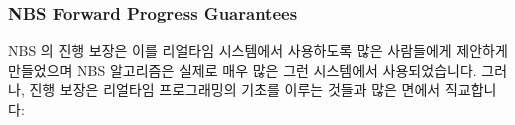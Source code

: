 \fi

\subsubsection{NBS Forward Progress Guarantees}
\label{sec:advsync:NBS Forward Progress Guarantees}

NBS 의 진행 보장은 이를 리얼타임 시스템에서 사용하도록 많은 사람들에게 제안하게
만들었으며 NBS 알고리즘은 실제로 매우 많은 그런 시스템에서 사용되었습니다.
그러나, 진행 보장은 리얼타임 프로그래밍의 기초를 이루는 것들과 많은 면에서
직교합니다:

\iffalse

NBS's forward-progress guarantees have caused many to suggest its use in
real-time systems, and NBS algorithms are in fact used in a great many
such systems.
However, it is important to note that forward-progress guarantees are
largely orthogonal to those that form the basis of real-time programming:

\fi


